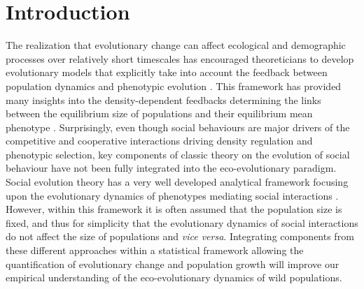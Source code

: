 \documentclass{article}
\begin{document}
\newpage
\section{Introduction}
 The realization that evolutionary change can affect ecological and demographic processes over relatively short timescales has encouraged theoreticians to develop evolutionary models that explicitly take into account the feedback between population dynamics and phenotypic evolution \citep{Govaert2019, hendry2016eco}. This framework has provided many insights into the density-dependent feedbacks determining the links between the equilibrium size of populations and their equilibrium mean phenotype \citep{MacArthur1962, Charlesworth1994, Lande2009a, Engen2013, Engen2020}. Surprisingly, even though social behaviours are major drivers of the competitive and cooperative interactions driving density regulation and phenotypic selection, key components of classic theory on the evolution of social behaviour have not been fully integrated into the eco-evolutionary paradigm. Social evolution theory has a very well developed analytical framework focusing upon the evolutionary dynamics of phenotypes mediating social interactions \citep{frank1998foundations, Wolf1999SocialSelection, Queller1985a, Queller2017, Araya-Ajoy2020}. However, within this framework it is often assumed that the population size is fixed, and thus for simplicity that the evolutionary dynamics of social interactions do not affect the size of populations and  \textit{vice versa}. Integrating components from these different approaches within a statistical framework allowing the quantification of evolutionary change and population growth will improve our empirical understanding of the eco-evolutionary dynamics of wild populations.
\end{document}
